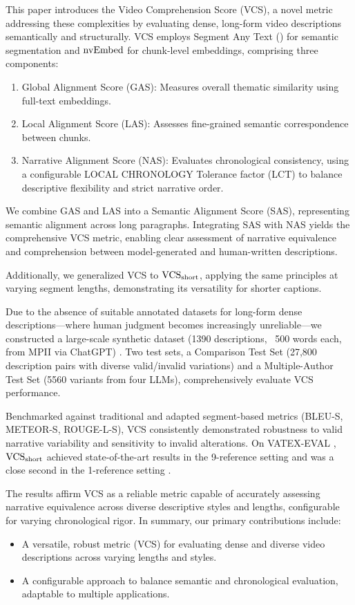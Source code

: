 This paper introduces the Video Comprehension Score (VCS), a novel metric addressing these complexities by evaluating dense, long-form video descriptions semantically and structurally. VCS employs Segment Any Text (\SaT) \cite{frohmann2024segment} for semantic segmentation and $\text{nvEmbed}$ \cite{lee2024nv} for chunk-level embeddings, comprising three components:

\begin{enumerate}
\item Global Alignment Score (GAS): Measures overall thematic similarity using full-text embeddings.
\item Local Alignment Score (LAS): Assesses fine-grained semantic correspondence between chunks.
\item Narrative Alignment Score (NAS): Evaluates chronological consistency, using a configurable LOCAL CHRONOLOGY Tolerance factor (LCT) to balance descriptive flexibility and strict narrative order.
\end{enumerate}

We combine GAS and LAS into a Semantic Alignment Score (SAS), representing semantic alignment across long paragraphs. Integrating SAS with NAS yields the comprehensive VCS metric, enabling clear assessment of narrative equivalence and comprehension between model-generated and human-written descriptions.

Additionally, we generalized VCS to $\text{VCS}_{\text{short}}$, applying the same principles at varying segment lengths, demonstrating its versatility for shorter captions.

Due to the absence of suitable annotated datasets for long-form dense descriptions—where human judgment becomes increasingly unreliable—we constructed a large-scale synthetic dataset (1390 descriptions, ~500 words each, from MPII via ChatGPT) \cite{rohrbach2015dataset, achiam2023gpt}. Two test sets, a Comparison Test Set (27,800 description pairs with diverse valid/invalid variations) and a Multiple-Author Test Set (5560 variants from four LLMs), comprehensively evaluate VCS performance.

Benchmarked against traditional and adapted segment-based metrics (BLEU-S, METEOR-S, ROUGE-L-S), VCS consistently demonstrated robustness to valid narrative variability and sensitivity to invalid alterations. On VATEX-EVAL \cite{shi2022emscore}, $\text{VCS}_{\text{short}}$ achieved state-of-the-art results in the 9-reference setting and was a close second in the 1-reference setting \cite{sarto2023positive}.

The results affirm VCS as a reliable metric capable of accurately assessing narrative equivalence across diverse descriptive styles and lengths, configurable for varying chronological rigor. In summary, our primary contributions include:

\begin{itemize}
\item A versatile, robust metric (VCS) for evaluating dense and diverse video descriptions across varying lengths and styles.
\item A configurable approach to balance semantic and chronological evaluation, adaptable to multiple applications.
\end{itemize}